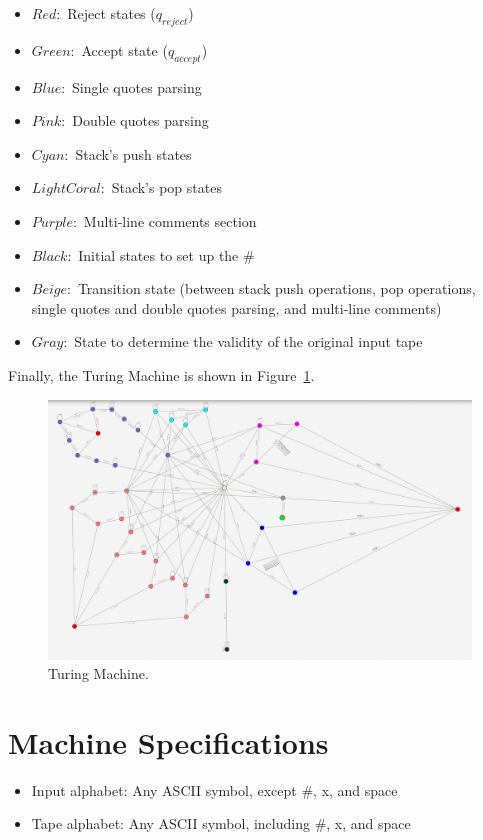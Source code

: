 \documentclass{article}
\begin{document}
\begin{itemize}
    \item $Red:$ Reject states ($q_{reject}$)
    \item $Green:$ Accept state ($q_{accept}$)
    \item $Blue:$ Single quotes parsing
    \item $Pink:$ Double quotes parsing
    \item $Cyan:$ Stack's push states  
    \item $LightCoral:$ Stack's pop states
    \item $Purple:$ Multi-line comments section 
    \item $Black:$ Initial states to set up the $\#$
    \item $Beige:$ Transition state (between stack push operations, pop operations, single quotes and double quotes parsing, and multi-line comments)
    \item $Gray:$ State to determine the validity of the original input tape
\end{itemize}

Finally, the Turing Machine is shown in Figure\ \ref{fig: Turing Machine Pseudo-Parser}.
\begin{figure}[h]
    \includegraphics[width=\linewidth]{TuringMachineParser.png}
    \caption{Turing Machine.}\label{fig: Turing Machine Pseudo-Parser}
\end{figure}


\section{Machine Specifications}

\begin{itemize}
    \item Input alphabet: Any ASCII symbol, except $\#$, x, and space
    \item Tape alphabet:  Any ASCII symbol, including $\#$, x, and space
\end{itemize}
\end{document}

